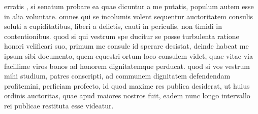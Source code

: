  erratis , si senatum probare ea quae dicuntur a me putatis, populum autem esse in alia voluntate. omnes qui se incolumis volent sequentur auctoritatem consulis soluti a cupiditatibus, liberi a delictis, cauti in periculis, non timidi in contentionibus. quod si qui vestrum spe ducitur se posse turbulenta ratione honori velificari suo, primum me consule id sperare desistat, deinde habeat me ipsum sibi documento, quem equestri ortum loco consulem videt, quae vitae via facillime viros bonos ad honorem dignitatemque perducat. quod si vos vestrum mihi studium, patres conscripti, ad communem dignitatem defendendam profitemini, perficiam profecto, id quod maxime res publica desiderat, ut huius ordinis auctoritas, quae apud maiores nostros fuit, eadem nunc longo intervallo rei publicae restituta esse videatur.
